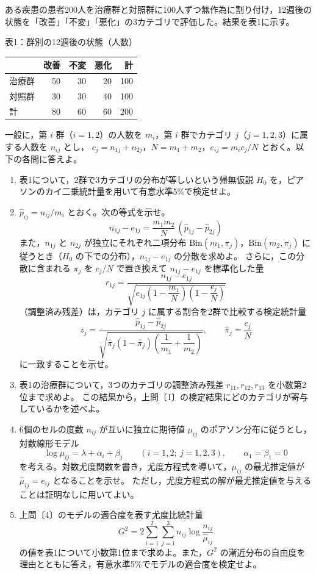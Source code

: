 \documentclass[a4paper,10pt]{ltjsarticle}
\begin{document}
ある疾患の患者200人を治療群と対照群に100人ずつ無作為に割り付け，12週後の状態を「改善」「不変」「悪化」の3カテゴリで評価した。結果を表1に示す。
\begin{center}
表1：群別の12週後の状態（人数）\par\smallskip
\begin{tabular}{lrrrr}
\toprule
 & 改善 & 不変 & 悪化 & 計\\
\midrule
治療群 & 50 & 30 & 20 & 100\\
対照群 & 30 & 30 & 40 & 100\\
\midrule
計 & 80 & 60 & 60 & 200\\
\bottomrule
\end{tabular}
\end{center}
一般に，第 $i$ 群（$i=1,2$）の人数を $m_i$，第 $i$ 群でカテゴリ $j$（$j=1,2,3$）に属する人数を $n_{ij}$ とし，
$c_j=n_{1j}+n_{2j}$，$N=m_1+m_2$，$e_{ij}=m_ic_j/N$ とおく。以下の各問に答えよ。
\begin{enumerate}
\item 表1について，2群で3カテゴリの分布が等しいという帰無仮説 $H_0$ を，ピアソンのカイ二乗統計量を用いて有意水準5\%で検定せよ。
\item $\hat p_{ij}=n_{ij}/m_i$ とおく。次の等式を示せ。
\[
n_{1j}-e_{1j}=\frac{m_1m_2}{N}\,(\hat p_{1j}-\hat p_{2j})
\]
また，$n_{1j}$ と $n_{2j}$ が独立にそれぞれ二項分布 $\mathrm{Bin}(m_1,\pi_j)$，$\mathrm{Bin}(m_2,\pi_j)$ に従うとき（$H_0$ の下での分布），$n_{1j}-e_{1j}$ の分散を求めよ。
さらに，この分散に含まれる $\pi_j$ を $c_j/N$ で置き換えて $n_{1j}-e_{1j}$ を標準化した量
\[
r_{1j}=\frac{n_{1j}-e_{1j}}{\sqrt{e_{1j}\left(1-\dfrac{m_1}{N}\right)\left(1-\dfrac{c_j}{N}\right)}}
\]
（調整済み残差）は，カテゴリ $j$ に属する割合を2群で比較する検定統計量
\[
z_j=\frac{\hat p_{1j}-\hat p_{2j}}{\sqrt{\hat\pi_j(1-\hat\pi_j)\left(\dfrac1{m_1}+\dfrac1{m_2}\right)}},\qquad\hat\pi_j=\frac{c_j}{N}
\]
に一致することを示せ。
\item 表1の治療群について，3つのカテゴリの調整済み残差 $r_{11},r_{12},r_{13}$ を小数第2位まで求めよ。
この結果から，上問〔1〕の検定結果にどのカテゴリが寄与しているかを述べよ。
\item 6個のセルの度数 $n_{ij}$ が互いに独立に期待値 $\mu_{ij}$ のポアソン分布に従うとし，対数線形モデル
\[
\log\mu_{ij}=\lambda+\alpha_i+\beta_j\qquad(i=1,2;\ j=1,2,3),\qquad \alpha_1=\beta_1=0
\]
を考える。対数尤度関数を書き，尤度方程式を導いて，$\mu_{ij}$ の最尤推定値が $\hat\mu_{ij}=e_{ij}$ となることを示せ。
ただし，尤度方程式の解が最尤推定値を与えることは証明なしに用いてよい。
\item 上問〔4〕のモデルの適合度を表す尤度比統計量
\[
G^2=2\sum_{i=1}^{2}\sum_{j=1}^{3}n_{ij}\log\frac{n_{ij}}{\hat\mu_{ij}}
\]
の値を表1について小数第1位まで求めよ。また，$G^2$ の漸近分布の自由度を理由とともに答え，有意水準5\%でモデルの適合度を検定せよ。
\end{enumerate}
\newpage
\end{document}
